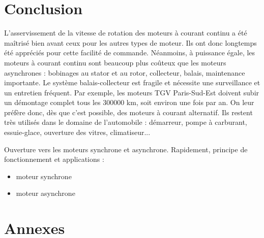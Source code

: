 \documentclass[11pt,a4paper]{report}
\begin{document}
\newpage
\section*{Conclusion}

L'asservissement de la vitesse de rotation des moteurs à courant continu a été maîtrisé bien avant ceux pour les autres types de moteur. Ils ont donc longtemps été appréciés pour cette facilité de commande. Néanmoins, à puissance égale, les moteurs à courant continu sont beaucoup plus coûteux que les moteurs
asynchrones : bobinages au stator et au rotor, collecteur, balais, maintenance importante. Le système balais-collecteur est fragile et nécessite une surveillance et un entretien fréquent. Par exemple, les moteurs TGV Paris-Sud-Est doivent subir un démontage complet tous les 300000 km, soit environ une fois par an. On leur préfère donc, dès que c'est possible, des moteurs à courant alternatif. Ils restent très utilisés dans le domaine de l'automobile : démarreur, pompe à carburant, essuie-glace, ouverture des vitres, climatiseur...

Ouverture vers les moteurs synchrone et asynchrone. Rapidement, principe de fonctionnement et applications :
\begin{itemize}
	\item moteur synchrone
	\item moteur asynchrone
\end{itemize}
\newpage
\section*{Annexes}
\end{document}
